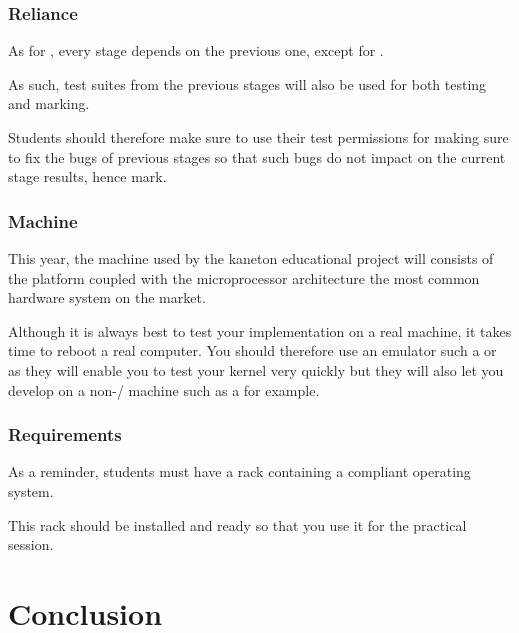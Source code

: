 
\begin{frame}
  \frametitle{Reliance}

  As for , every stage depends on the previous one, except
  for .

  \-

  As such, test suites from the previous stages will also be used for both
  testing and marking.

  \-

  Students should therefore make sure to use their test permissions for making
  sure to fix the bugs of previous stages so that such bugs do not impact
  on the current stage results, hence mark.
\end{frame}


\begin{frame}
  \frametitle{Machine}

  This year, the machine used by the kaneton educational project will consists
  of the  platform coupled with the  microprocessor
  architecture \ie{} the most common hardware system on the market.

  \-

  Although it is always best to test your implementation on a real machine,
  it takes time to reboot a real computer. You should therefore use an
  emulator such a  or  as they will enable you to
  test your kernel very quickly but they will also let you develop on
  a non-/ machine such as a  for example.
\end{frame}


\begin{frame}
  \frametitle{Requirements}

  As a reminder, students must have a rack containing a  compliant
  operating system.

  \-

  This rack should be installed and ready so that you use it for the
   practical session.
\end{frame}

%
%

\section{Conclusion}


